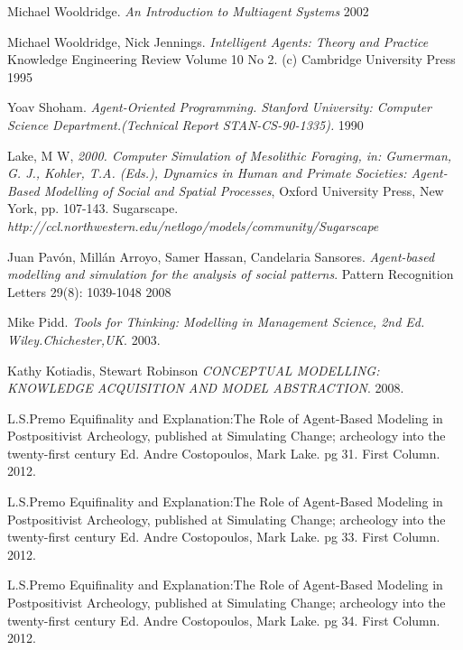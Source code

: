 \documentclass[11pt,oneside,a4paper,openright]{report}
\begin{document}
\begin{thebibliography}{13}
	Michael Wooldridge.
	\emph{An Introduction to Multiagent Systems}
	2002

	 Michael Wooldridge, Nick Jennings.
	\emph{Intelligent Agents: Theory and Practice}  Knowledge Engineering Review Volume 10 No 2. (c) Cambridge
	University Press 
	1995

	Yoav Shoham.
	\emph{Agent-Oriented Programming. Stanford University: Computer Science Department.(Technical Report STAN-CS-90-1335).}
	1990 

	Lake, M W,
	\emph{2000. Computer Simulation of Mesolithic Foraging, in: Gumerman, G. J., Kohler, T.A. (Eds.), Dynamics in Human and Primate Societies: Agent-Based Modelling of Social and Spatial Processes}, Oxford University Press, New York, pp. 107-143.
	Sugarscape.
	\emph{http://ccl.northwestern.edu/netlogo/models/community/Sugarscape}

	Juan Pavón, Millán Arroyo, Samer Hassan, Candelaria Sansores.
	\emph{Agent-based modelling and simulation for the analysis of social patterns}. Pattern Recognition Letters 29(8): 1039-1048 
	2008

	Mike Pidd.
	\emph{Tools for Thinking: Modelling in Management Science, 2nd Ed. Wiley.Chichester,UK}.
	2003.

	Kathy Kotiadis, Stewart Robinson
	\emph{CONCEPTUAL MODELLING: KNOWLEDGE ACQUISITION AND MODEL ABSTRACTION}.
	2008.

	L.S.Premo
	Equifinality and Explanation:The Role of Agent-Based Modeling in Postpositivist Archeology, published at Simulating Change; archeology into the twenty-first century Ed. Andre Costopoulos, Mark Lake. pg 31. First Column.
	2012.

	L.S.Premo
	Equifinality and Explanation:The Role of Agent-Based Modeling in Postpositivist Archeology, published at Simulating Change; archeology into the twenty-first century Ed. Andre Costopoulos, Mark Lake. pg 33. First Column.
	2012.

	L.S.Premo
	Equifinality and Explanation:The Role of Agent-Based Modeling in Postpositivist Archeology, published at Simulating Change; archeology into the twenty-first century Ed. Andre Costopoulos, Mark Lake. pg 34. First Column.
	2012.


\end{thebibliography}
\end{document}
